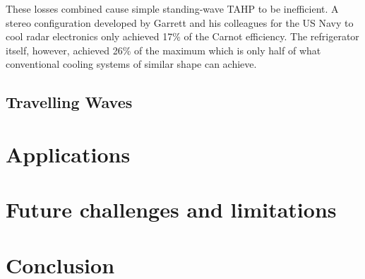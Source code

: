 \documentclass{article}
\begin{document}
These losses combined cause simple standing-wave TAHP to be inefficient. A stereo configuration developed by Garrett\cite{powerofsound} and his colleagues for the US Navy to cool radar electronics only achieved 17\% of the Carnot efficiency. The refrigerator itself, however, achieved 26\% of the maximum which is only half of what conventional cooling systems of similar shape can achieve. %

\subsection{Travelling Waves}









\section{Applications}

\section{Future challenges and limitations}

\section{Conclusion}


\end{document}
